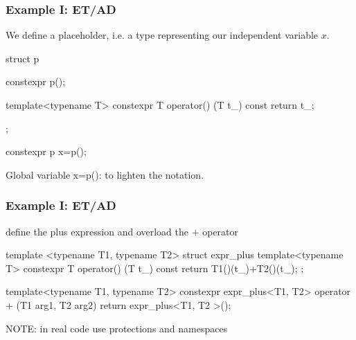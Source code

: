 \documentclass[aspectratio=43]{beamer}
\begin{document}

\begin{frame}[fragile]\frametitle{Example I: ET/AD}
  We define a placeholder, i.e. a type representing our independent variable $x$.
\begin{Cpplisting}[: p.cpp]{}
struct p{
  constexpr p(){};

  template<typename T>
  constexpr T operator() (T t_) const {
    return t_;
  }
};

constexpr p x=p();
\end{Cpplisting}
Global variable x=p(): to lighten the notation.
\end{frame}


\begin{frame}[fragile]\frametitle{Example I: ET/AD}
  define the plus expression and overload the $+$ operator
\begin{Cpplisting}{}
template <typename T1, typename T2>
struct expr_plus{
  template<typename T>
  constexpr T operator() (T t_) const{
    return T1()(t_)+T2()(t_);
  }
};

template<typename T1, typename T2>
constexpr expr_plus<T1, T2>
operator + (T1 arg1, T2 arg2){
  return expr_plus<T1, T2 >();}
\end{Cpplisting}
NOTE: in real code use protections and namespaces
\end{frame}
\end{document}
